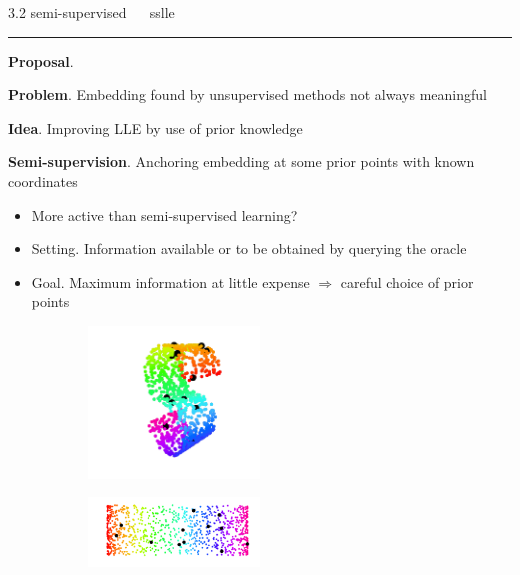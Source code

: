 \documentclass[11pt, compress, t, notes = noshow, xcolor = table, 
aspectratio = 1610]{beamer}
\newcommand{\highlight}[1]{\textcolor{highlightcol}{\textbf{#1}}}
\newcommand{\arritem}{\item[\highlight{$\rightarrow$}]}
\begin{document}
\LARGE
\begin{frame}{\textcolor{gray!90}{3.2 semi-supervised} ~~ sslle}
\normalsize
\vspace{-0.5cm}
\noindent \textcolor{gray!90}{\rule{\textwidth}{1pt}}
\smallskip

\textbf{Proposal}. \citet{yangetal2006}

\vspace{0.3cm}

\textbf{Problem}. Embedding found by unsupervised methods not always meaningful

\vspace{0.3cm}

\textbf{Idea}. Improving LLE by use of prior knowledge

\vspace{0.3cm}

\textbf{Semi-supervision}. Anchoring embedding at some prior points with known 
coordinates

\begin{itemize}
  \arritem More active than semi-supervised learning?
  \arritem Setting. Information available or to be obtained by querying the 
  oracle
  \arritem Goal. Maximum information at little expense $\Rightarrow$ careful 
  choice of prior points
\end{itemize}

\vspace{0.3cm}

\begin{figure}[H]
 \begin{subfigure}[c]{0.2\textwidth}
  \centering
   \includegraphics[trim = 70 30 70 30, clip, %
      width = 0.5\textwidth]{figures/s-curve-pp-random}
 \end{subfigure}
 \hfill
 \begin{subfigure}[c]{0.7\textwidth}
   \includegraphics[trim = 80 20 0 0, clip, %
      width = 0.5\textwidth]{figures/s-curve-pp-undone-random}
 \end{subfigure}
\end{figure}

\end{frame}
\end{document}
